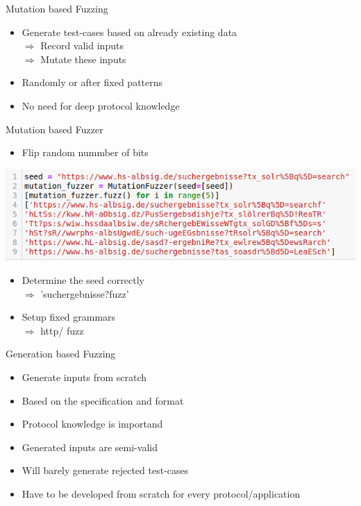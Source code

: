 \documentclass{beamer}
\begin{document}
\begin{frame}{Mutation based Fuzzing}
\begin{itemize}
 \item Generate test-cases based on already existing data\\
 $\Rightarrow$ Record valid inputs\\
 $\Rightarrow$ Mutate these inputs
 \item Randomly or after fixed patterns
 \item No need for deep protocol knowledge
 
\end{itemize}
\end{frame}
\begin{frame}{Mutation based Fuzzer}
\begin{itemize}
 \item Flip random nummber of bits
\end{itemize}
 \includegraphics[scale=0.5]{mutatate.png}
\end{frame}
\begin{frame}
 \begin{itemize}
 \item Determine the seed correctly\\
 $\Rightarrow$ 'suchergebnisse?fuzz'
  \item Setup fixed grammars\\
  $\Rightarrow$ http/
  fuzz
 \end{itemize}
 
\end{frame}
\begin{frame}{Generation based Fuzzing}
 \begin{itemize}
  \item Generate inputs from scratch
  \item Based on the specification and format
  \item Protocol knowledge is importand
  \item Generated inputs are semi-valid
  \item Will barely generate rejected test-cases
  \item Have to be developed from scratch for every protocol/application 
  
 \end{itemize}
\end{frame}
\end{document}
